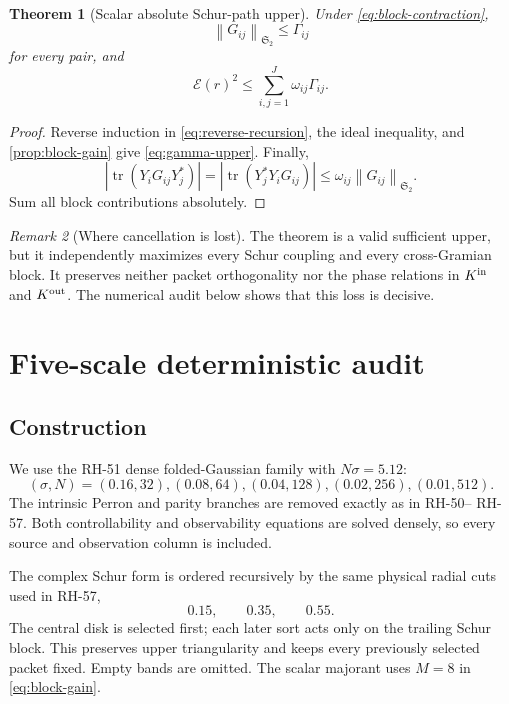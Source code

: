 \documentclass[11pt]{article}
\newtheorem{theorem}{Theorem}[section]
\theoremstyle{remark}
\newtheorem{remark}[theorem]{Remark}
\newcommand{\norm}[1]{\left\lVert#1\right\rVert}
\newcommand{\HS}{\mathfrak S_2}
\newcommand{\cE}{\mathcal E}
\newcommand{\tr}{\operatorname{tr}}
\begin{document}
\begin{theorem}[Scalar absolute Schur-path upper]
\label{thm:path-upper}
Under \eqref{eq:block-contraction},
\begin{equation}
 \norm{G_{ij}}_{\HS}\le\Gamma_{ij}
 \label{eq:gamma-upper}
\end{equation}
for every pair, and
\begin{equation}
 \boxed{
 \cE(r)^2\le\sum_{i,j=1}^J\omega_{ij}\Gamma_{ij}.}
 \label{eq:path-upper}
\end{equation}
\end{theorem}

\begin{proof}
Reverse induction in \eqref{eq:reverse-recursion}, the ideal inequality, and
\cref{prop:block-gain} give \eqref{eq:gamma-upper}.  Finally,
\[
 |\tr(Y_iG_{ij}Y_j^*)|
 =|\tr(Y_j^*Y_iG_{ij})|
 \le\omega_{ij}\norm{G_{ij}}_{\HS}.
\]
Sum all block contributions absolutely.
\end{proof}

\begin{remark}[Where cancellation is lost]
The theorem is a valid sufficient upper, but it independently maximizes every
Schur coupling and every cross-Gramian block.  It preserves neither packet
orthogonality nor the phase relations in $K^{\rm in}$ and $K^{\rm out}$.
The numerical audit below shows that this loss is decisive.
\end{remark}

\section{Five-scale deterministic audit}
\label{sec:audit}

\subsection{Construction}

We use the RH-51 dense folded-Gaussian family with $N\sigma=5.12$:
\[
 (\sigma,N)=(0.16,32),(0.08,64),(0.04,128),(0.02,256),(0.01,512).
\]
The intrinsic Perron and parity branches are removed exactly as in RH-50--
RH-57.  Both controllability and observability equations are solved densely,
so every source and observation column is included.

The complex Schur form is ordered recursively by the same physical radial
cuts used in RH-57,
\begin{equation}
 0.15,\qquad0.35,\qquad0.55.
 \label{eq:cuts}
\end{equation}
The central disk is selected first; each later sort acts only on the trailing
Schur block.  This preserves upper triangularity and keeps every previously
selected packet fixed.  Empty bands are omitted.  The scalar majorant uses
$M=8$ in \eqref{eq:block-gain}.
\end{document}

